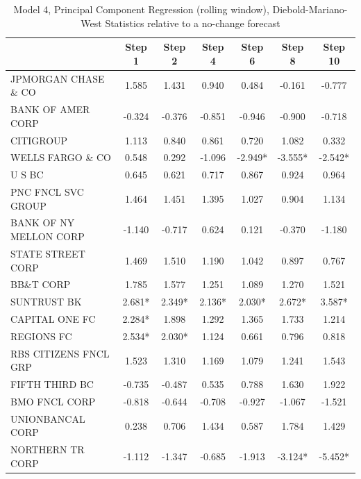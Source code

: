 \documentclass[11pt]{article}
\begin{document}
\begin{table} 
\caption{Model 4, Principal Component Regression (rolling window), Diebold-Mariano-West Statistics relative to a no-change forecast}                                                       
                                                      
\center                                                             
\begin{tabular}{|l|c|c|c|c|c|c|}                                    
\hline                                                              
&Step 1 &Step 2 &Step 4 &Step 6 &Step 8 &Step 10\\                  
\hline                                                              
JPMORGAN CHASE \& CO  &1.585&1.431&0.940&0.484&-0.161&-0.777\\      
BANK OF AMER CORP     &-0.324&-0.376&-0.851&-0.946&-0.900&-0.718\\  
CITIGROUP             &1.113&0.840&0.861&0.720&1.082&0.332\\        
WELLS FARGO \& CO     &0.548&0.292&-1.096&-2.949*&-3.555*&-2.542*\\ 
U S BC                &0.645&0.621&0.717&0.867&0.924&0.964\\        
PNC FNCL SVC GROUP    &1.464&1.451&1.395&1.027&0.904&1.134\\        
BANK OF NY MELLON CORP&-1.140&-0.717&0.624&0.121&-0.370&-1.180\\    
STATE STREET CORP     &1.469&1.510&1.190&1.042&0.897&0.767\\        
BB\&T CORP            &1.785&1.577&1.251&1.089&1.270&1.521\\        
SUNTRUST BK           &2.681*&2.349*&2.136*&2.030*&2.672*&3.587*\\  
CAPITAL ONE FC        &2.284*&1.898&1.292&1.365&1.733&1.214\\       
REGIONS FC            &2.534*&2.030*&1.124&0.661&0.796&0.818\\      
RBS CITIZENS FNCL GRP &1.523&1.310&1.169&1.079&1.241&1.543\\        
FIFTH THIRD BC        &-0.735&-0.487&0.535&0.788&1.630&1.922\\      
BMO FNCL CORP         &-0.818&-0.644&-0.708&-0.927&-1.067&-1.521\\  
UNIONBANCAL CORP      &0.238&0.706&1.434&0.587&1.784&1.429\\        
NORTHERN TR CORP      &-1.112&-1.347&-0.685&-1.913&-3.124*&-5.452*\\

\end{tabular}
\end{table}
\end{document}
